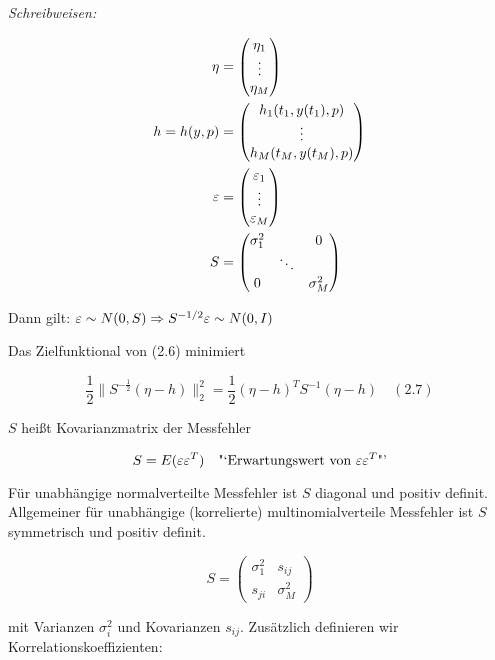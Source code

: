 \emph{Schreibweisen:}

\begin{align*}
\eta &= \begin{pmatrix} \eta_1 \\ \vdots \\ \eta_M \end{pmatrix} \\
h = h(y,p) &= \begin{pmatrix} h_1(t_1,y(t_1), p) \\ \vdots \\ h_M(t_M, y(t_M),p) \end{pmatrix} \\
\varepsilon &= \begin{pmatrix} \varepsilon_1 \\ \vdots \\ \varepsilon_M \end{pmatrix}\\
S &= \begin{pmatrix} \sigma_1^2 & & 0 \\ & \ddots & \\ 0 & & \sigma_M^2 \end{pmatrix}
\end{align*}

Dann gilt: $\varepsilon \sim N(0,S) \Rightarrow S^{-1/2} \varepsilon \sim N(0,I)$

Das Zielfunktional von (2.6) minimiert

\[ \frac 12 \| S^{-\frac 12} (\eta-h)\|_2^2 = \frac 12 (\eta -h)^T S^{-1} (\eta-h) \quad (2.7) \]

$S$ heißt Kovarianzmatrix der Messfehler

\[S = E (\varepsilon\varepsilon^T) \quad \text{"`Erwartungswert von $\varepsilon\varepsilon^T$"'}\]

Für unabhängige normalverteilte Messfehler ist $S$ diagonal und positiv definit. Allgemeiner für unabhängige (korrelierte) multinomialverteile Messfehler ist $S$ symmetrisch und positiv definit.

\[ S=\begin{pmatrix} \sigma_1^2 & s_{ij} \\ s_{ji} & \sigma_M^2 \end{pmatrix} \]

mit Varianzen $\sigma_i^2$ und Kovarianzen $s_{ij}$. Zusätzlich definieren wir Korrelationskoeffizienten:


